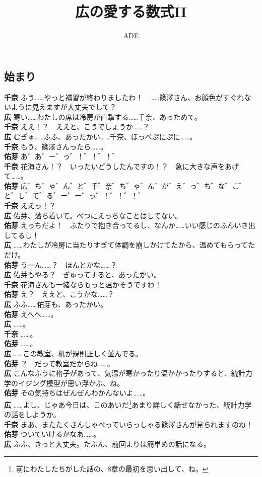 \documentclass[paper=b5j,fontsize=12Q,jafontsize=12Q,baselineskip=21Q]{jlreq}
\title{広の愛する数式II}
\author{ADE}
\date{}
\DeclareRobustCommand{\hiron}{\textbf{広 }}
\DeclareRobustCommand{\chinan}{\textbf{千奈 }}
\DeclareRobustCommand{\umen}{\textbf{佑芽 }}
\begin{document}
\maketitle

\begin{refsection}
\section{始まり}
\chinan ふう……やっと補習が終わりましたわ！　……篠澤さん、お顔色がすぐれないように見えますが大丈夫でして？
\\\hiron 寒い……わたしの席は冷房が直撃する……千奈、あっためて。
\\\chinan ええ！？　ええと、こうでしょうか……？
\\\hiron むぎゅ……ふふ、あったかい……千奈、ほっぺぷにぷに……。
\\\chinan もう、篠澤さんったら……。
\\\umen あ゛あ゛ー゛っ゛！゛！゛！゛
\\\chinan 花海さん！？　いったいどうしたんですの！？　急に大きな声をあげて……。
\\\umen 広゛ち゛ゃ゛ん゛と゛千゛奈゛ち゛ゃ゛ん゛が゛え゛っ゛ち゛な゛こ゛と゛し゛て゛る゛ー゛ー゛っ゛！゛！゛！゛
\\\chinan ええっ！？
\\\hiron 佑芽、落ち着いて。べつにえっちなことはしてない。
\\\umen えっちだよ！　ふたりで抱き合ってるし、なんか……いい感じのふんいき出してるし！
\\\hiron ……わたしが冷房に当たりすぎて体調を崩しかけてたから、温めてもらってただけ。
\\\umen うーん……？　ほんとかな……？
\\\hiron 佑芽もやる？　ぎゅってすると、あったかい。
\\\chinan 花海さんも一緒ならもっと温かそうですわ！
\\\umen え？　ええと、こうかな……？
\\\hiron ふふ……佑芽も、あったかい。
\\\umen えへへ……。
\\\hiron ……。
\\\chinan ……。
\\\umen ……。
\\\hiron ……この教室、机が規則正しく並んでる。
\\\umen ？　だって教室だからね……。
\\\hiron こんなふうに格子があって、気温が寒かったり温かかったりすると、統計力学のイジング模型が思い浮かぶ、ね。
\\\umen その気持ちはぜんぜんわかんないよ……。
\\\hiron ……よし、じゃあ今日は、このあいだ\footnote{前にわたしたちがした話\cite{Shinosawa:2025, GitHub:ShinosawaButsuri2}の、8章の最初を思い出して、ね。}あまり詳しく話せなかった、統計力学の話をしようか。
\\\chinan まあ、またたくさんしゃべっていらっしゃる篠澤さんが見られますのね！
\\\umen ついていけるかなあ……。
\\\hiron ふふ、きっと大丈夫。たぶん、前回よりは簡単めの話になる。


\end{refsection}
\end{document}
